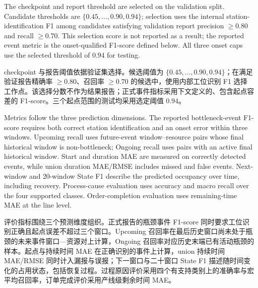 \documentclass[a4paper,fleqn]{cas-dc}
\newcommand{\zhpara}[1]{%
  \par\begingroup\small\color{black!72}\noindent #1\par\endgroup}
\begin{document}
The checkpoint and report threshold are selected on the validation split. Candidate thresholds are $\{0.45,\dots,0.90,0.94\}$; selection uses the internal station-identification F1 among candidates satisfying validation report precision $\geq0.80$ and recall $\geq0.70$. This selection score is not reported as a result; the reported event metric is the onset-qualified F1-score defined below. All three onset caps use the selected threshold of $0.94$ for testing.

\zhpara{checkpoint 与报告阈值依据验证集选择。候选阈值为 $\{0.45,\dots,0.90,0.94\}$；在满足验证报告精确率 $\geq0.80$、召回率 $\geq0.70$ 的候选中，使用内部工位识别 F1 选择工作点。该选择分数不作为结果报告；正式事件指标采用下文定义的、包含起点容差的 F1-score。三个起点范围的测试均采用选定阈值 $0.94$。}

Metrics follow the three prediction dimensions. The reported bottleneck-event F1-score requires both correct station identification and an onset error within three windows. Upcoming recall uses future-event window--resource pairs whose final historical window is non-bottleneck; Ongoing recall uses pairs with an active final historical window. Start and duration MAE are measured on correctly detected events, while union duration MAE/RMSE includes missed and false events. Next-window and 20-window State F1 describe the predicted occupancy over time, including recovery. Process-cause evaluation uses accuracy and macro recall over the four supported classes. Order-completion evaluation uses remaining-time MAE at the line level.

\zhpara{评价指标围绕三个预测维度组织。正式报告的瓶颈事件 F1-score 同时要求工位识别正确且起点误差不超过三个窗口。Upcoming 召回率在最后历史窗口尚未处于瓶颈的未来事件窗口—资源对上计算，Ongoing 召回率对应历史末端已有活动瓶颈的样本。起点与持续时间 MAE 在正确识别的事件上计算，union 持续时间 MAE/RMSE 同时计入漏报与误报；下一窗口与二十窗口 State F1 描述随时间变化的占用状态，包括恢复过程。过程原因评价采用四个有支持类别上的准确率与宏平均召回率，订单完成评价采用产线级剩余时间 MAE。}
\end{document}

